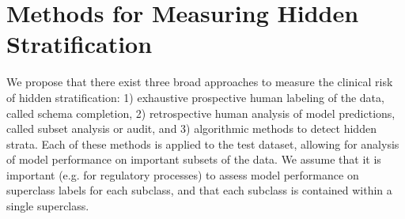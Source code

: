 \documentclass{article}
\begin{document}

\section{Methods for Measuring Hidden Stratification}
We propose that there exist three broad approaches to measure the clinical risk of hidden stratification: 1) exhaustive prospective human labeling of the data, called schema completion, 2) retrospective human analysis of model predictions, called subset analysis or audit, and 3) algorithmic methods to detect hidden strata. Each of these methods is applied to the test dataset, allowing for analysis of model performance on important subsets of the data.  We assume that it is important (e.g. for regulatory processes) to assess model performance on superclass labels for each subclass, and that each subclass is contained within a single superclass. 
\end{document}
